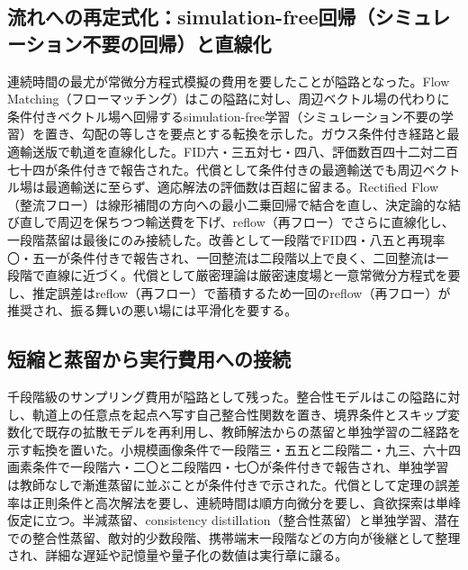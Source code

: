 \documentclass[lualatex,a4paper,10pt]{jlreq}
\begin{document}
\subsection{流れへの再定式化：simulation-free回帰（シミュレーション不要の回帰）と直線化}
連続時間の最尤が常微分方程式模擬の費用を要したことが隘路となった。Flow Matching（フローマッチング）はこの隘路に対し、周辺ベクトル場の代わりに条件付きベクトル場へ回帰するsimulation-free学習（シミュレーション不要の学習）を置き、勾配の等しさを要点とする転換を示した\autocite{btd027}。ガウス条件付き経路と最適輸送版で軌道を直線化した\autocite{btd027}。FID六・三五対七・四八、評価数百四十二対二百七十四が条件付きで報告された\autocite{btd027}。代償として条件付きの最適輸送でも周辺ベクトル場は最適輸送に至らず、適応解法の評価数は百超に留まる\autocite{btd027}。Rectified Flow（整流フロー）は線形補間の方向への最小二乗回帰で結合を直し、決定論的な結び直しで周辺を保ちつつ輸送費を下げ、reflow（再フロー）でさらに直線化し、一段階蒸留は最後にのみ接続した\autocite{btd028}。改善として一段階でFID四・八五と再現率〇・五一が条件付きで報告され、一回整流は二段階以上で良く、二回整流は一段階で直線に近づく\autocite{btd028}。代償として厳密理論は厳密速度場と一意常微分方程式を要し、推定誤差はreflow（再フロー）で蓄積するため一回のreflow（再フロー）が推奨され、振る舞いの悪い場には平滑化を要する\autocite{btd028}。

\subsection{短縮と蒸留から実行費用への接続}
千段階級のサンプリング費用が隘路として残った。整合性モデルはこの隘路に対し、軌道上の任意点を起点へ写す自己整合性関数を置き、境界条件とスキップ変数化で既存の拡散モデルを再利用し、教師解法からの蒸留と単独学習の二経路を示す転換を置いた\autocite{btd029}。小規模画像条件で一段階三・五五と二段階二・九三、六十四画素条件で一段階六・二〇と二段階四・七〇が条件付きで報告され、単独学習は教師なしで漸進蒸留に並ぶことが条件付きで示された\autocite{btd029}。代償として定理の誤差率は正則条件と高次解法を要し、連続時間は順方向微分を要し、貪欲探索は単峰仮定に立つ\autocite{btd029}。半減蒸留、consistency distillation（整合性蒸留）と単独学習、潜在での整合性蒸留、敵対的少数段階、携帯端末一段階などの方向が後継として整理され\autocite{btd078,btd079,btd080,btd081,btd082}、詳細な遅延や記憶量や量子化の数値は実行章に譲る。
\end{document}
